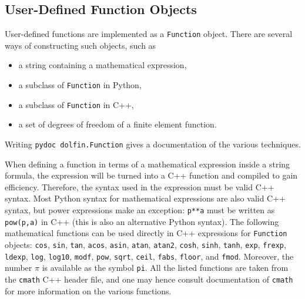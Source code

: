 \subsection{User-Defined Function Objects}
\label{langtangen:app:cpp:functions}

User-defined functions are implemented as a {\fontsize{12pt}{12pt}\texttt{Function}} object.
There are several ways of constructing such objects, such as
\begin{itemize}
\item a string containing a mathematical expression,
\item a subclass of {\fontsize{12pt}{12pt}\texttt{Function}} in Python,
\item a subclass of {\fontsize{12pt}{12pt}\texttt{Function}} in C++,
\item a set of degrees of freedom of a finite element function.
\end{itemize}
Writing {\fontsize{12pt}{12pt}\texttt{pydoc dolfin.Function}} gives a documentation of the various
techniques.

When defining a function in terms of a mathematical expression inside
a string formula, the expression will be turned into a C++ function
and compiled to gain efficiency. Therefore, 
the syntax used in the expression must be valid C++ syntax.
Most Python syntax for mathematical expressions are also valid C++ syntax,
but power expressions make an exception: {\fontsize{12pt}{12pt}\texttt{p**a}} must be written as
{\fontsize{12pt}{12pt}\texttt{pow(p,a)}} in C++ (this is also an alternative Python syntax).
The following mathematical functions can be used directly
in C++
expressions for {\fontsize{12pt}{12pt}\texttt{Function}} objects: 
{\fontsize{12pt}{12pt}\texttt{cos}}, {\fontsize{12pt}{12pt}\texttt{sin}}, {\fontsize{12pt}{12pt}\texttt{tan}}, {\fontsize{12pt}{12pt}\texttt{acos}}, {\fontsize{12pt}{12pt}\texttt{asin}},
{\fontsize{12pt}{12pt}\texttt{atan}}, {\fontsize{12pt}{12pt}\texttt{atan2}}, {\fontsize{12pt}{12pt}\texttt{cosh}}, {\fontsize{12pt}{12pt}\texttt{sinh}}, {\fontsize{12pt}{12pt}\texttt{tanh}}, {\fontsize{12pt}{12pt}\texttt{exp}},
{\fontsize{12pt}{12pt}\texttt{frexp}}, {\fontsize{12pt}{12pt}\texttt{ldexp}}, {\fontsize{12pt}{12pt}\texttt{log}}, {\fontsize{12pt}{12pt}\texttt{log10}}, {\fontsize{12pt}{12pt}\texttt{modf}},
{\fontsize{12pt}{12pt}\texttt{pow}}, {\fontsize{12pt}{12pt}\texttt{sqrt}}, {\fontsize{12pt}{12pt}\texttt{ceil}}, {\fontsize{12pt}{12pt}\texttt{fabs}}, {\fontsize{12pt}{12pt}\texttt{floor}}, and {\fontsize{12pt}{12pt}\texttt{fmod}}.
Moreover, the number $\pi$ is available as the symbol {\fontsize{12pt}{12pt}\texttt{pi}}.
All the listed functions are taken from the {\fontsize{12pt}{12pt}\texttt{cmath}} C++ header file, and
one may hence
consult documentation of {\fontsize{12pt}{12pt}\texttt{cmath}} for more information on the
various functions. 


